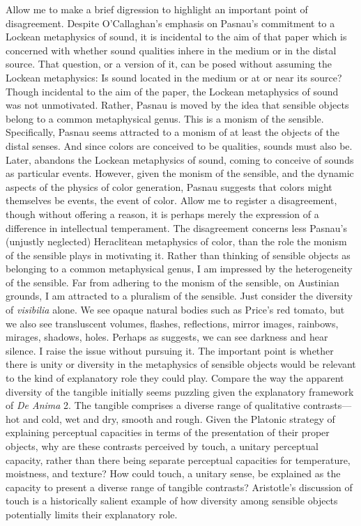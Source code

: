 Allow me to make a brief digression to highlight an important point of disagreement. Despite O'Callaghan's \citeyearpar{OCallaghan:2009aa} emphasis on Pasnau's \citeyearpar{Pasnau:1999ss} commitment to a Lockean metaphysics of sound, it is incidental to the aim of that paper which is concerned with whether sound qualities inhere in the medium or in the distal source. That question, or a version of it, can be posed without assuming the Lockean metaphysics: Is sound located in the medium or at or near its source? Though incidental to the aim of the paper, the Lockean metaphysics of sound was not unmotivated. Rather, Pasnau is moved by the idea that sensible objects belong to a common metaphysical genus. This is a monism of the sensible. Specifically, Pasnau seems attracted to a monism of at least the objects of the distal senses. And since colors are conceived to be qualities, sounds must also be. Later, \citet{Pasnau:2009ys} abandons the Lockean metaphysics of sound, coming to conceive of sounds as particular events. However, given the monism of the sensible, and the dynamic aspects of the physics of color generation, Pasnau suggests that colors might themselves be events, the event of color. Allow me to register a disagreement, though without offering a reason, it is perhaps merely the expression of a difference in intellectual temperament. The disagreement concerns less Pasnau's (unjustly neglected) Heraclitean metaphysics of color, than the role the monism of the sensible plays in motivating it. Rather than thinking of sensible objects as belonging to a common metaphysical genus, I am impressed by the heterogeneity of the sensible. Far from adhering to the monism of the sensible, on Austinian grounds, I am attracted to a pluralism of the sensible. Just consider the diversity of \emph{visibilia} alone. We see opaque natural bodies such as Price's \citeyearpar{Price:1932fk} red tomato, but we also see transluscent volumes, flashes, reflections, mirror images, rainbows, mirages, shadows, holes. Perhaps as \citet{Sorensen:2004jk,Sorensen:2008kx,Sorensen:2009aa} suggests, we can see darkness and hear silence. I raise the issue without pursuing it. The important point is whether there is unity or diversity in the metaphysics of sensible objects would be relevant to the kind of explanatory role they could play. Compare the way the apparent diversity of the tangible initially seems puzzling given the explanatory framework of \emph{De Anima} 2. The tangible comprises a diverse range of qualitative contrasts---hot and cold, wet and dry, smooth and rough. Given the Platonic strategy of explaining perceptual capacities in terms of the presentation of their proper objects, why are these contrasts perceived by touch, a unitary perceptual capacity, rather than there being separate perceptual capacities for temperature, moistness, and texture? How could touch, a unitary sense, be explained as the capacity to present a diverse range of tangible contrasts? Aristotle's discussion of touch is a historically salient example of how diversity among sensible objects potentially limits their explanatory role.

